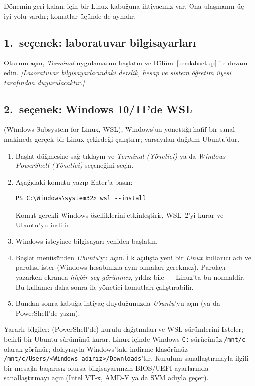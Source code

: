 Dönemin geri kalanı için bir Linux kabuğuna ihtiyacınız var. Ona ulaşmanın üç iyi yolu vardır; komutlar üçünde de aynıdır.

\subsection{1.\ seçenek: laboratuvar bilgisayarları}
Oturum açın, \emph{Terminal} uygulamasını başlatın ve Bölüm~\ref{sec:labsetup} ile devam edin. \emph{[Laboratuvar bilgisayarlarındaki derslik, hesap ve sistem öğretim üyesi tarafından duyurulacaktır.]}

\subsection{2.\ seçenek: Windows 10/11'de WSL}
 (Windows Subsystem for Linux, WSL), Windows'un yönettiği hafif bir sanal makinede gerçek bir Linux çekirdeği çalıştırır; varsayılan dağıtım Ubuntu'dur.

\begin{enumerate}[leftmargin=1.4em]
  \item Başlat düğmesine sağ tıklayın ve \emph{Terminal (Yönetici)} ya da \emph{Windows PowerShell (Yönetici)} seçeneğini seçin.
  \item Aşağıdaki komutu yazıp Enter'a basın:
\begin{lstlisting}[style=term]
PS C:\Windows\system32> wsl --install
\end{lstlisting}
  Komut gerekli Windows özelliklerini etkinleştirir, WSL~2'yi kurar ve Ubuntu'yu indirir.
  \item Windows isteyince bilgisayarı yeniden başlatın.
  \item Başlat menüsünden \emph{Ubuntu}'yu açın. İlk açılışta yeni bir \emph{Linux} kullanıcı adı ve parolası ister (Windows hesabınızla aynı olmaları gerekmez). Parolayı yazarken ekranda \emph{hiçbir şey görünmez}, yıldız bile --- Linux'ta bu normaldir. Bu kullanıcı daha sonra  ile yönetici komutları çalıştırabilir.
  \item Bundan sonra kabuğa ihtiyaç duyduğunuzda \emph{Ubuntu}'yu açın (ya da PowerShell'de  yazın).
\end{enumerate}

Yararlı bilgiler:  (PowerShell'de) kurulu dağıtımları ve WSL sürümlerini listeler;  belirli bir Ubuntu sürümünü kurar. Linux içinde Windows \texttt{C:} sürücünüz \texttt{/mnt/c} olarak görünür; dolayısıyla Windows'taki indirme klasörünüz \texttt{/mnt/c/Users/<Windows adınız>/Downloads}'tır. Kurulum sanallaştırmayla ilgili bir mesajla başarısız olursa bilgisayarınızın BIOS/UEFI ayarlarında sanallaştırmayı açın (Intel VT-x, AMD-V ya da SVM adıyla geçer).


